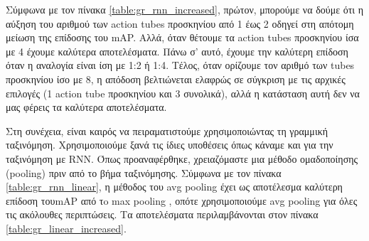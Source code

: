 Σύμφωνα με τον πίνακα  \ref{table:gr_rnn_increased}, πρώτον, μπορούμε να δούμε ότι η αύξηση του αριθμού των
\en action tubes \gr προσκηνίου από 1 έως 2 οδηγεί στη απότομη μείωση της  επίδοσης του \en mAP\gr.
Αλλά, όταν θέτουμε τα \en action tubes \gr προσκηνίου ίσα με 4 έχουμε καλύτερα αποτελέσματα. Πάνω σ' αυτό,
έχουμε την καλύτερη επίδοση όταν η αναλογία είναι ίση με 1:2 ή 1:4. Τέλος, όταν
 ορίζουμε τον αριθμό των \en tubes \gr προσκηνίου ίσο με 8, η απόδοση βελτιώνεται ελαφρώς
σε σύγκριση με τις αρχικές επιλογές (1 \en action tube \gr προσκηνίου και 3 συνολικά), αλλά η κατάσταση αυτή δεν
να μας φέρεις τα καλύτερα αποτελέσματα. \par
Στη συνέχεια, είναι καιρός να πειραματιστούμε χρησιμοποιώντας τη γραμμική ταξινόμηση. Χρησιμοποιούμε ξανά τις
ίδιες υποθέσεις όπως κάναμε και για την ταξινόμηση με \en RNN\gr. Όπως προαναφέρθηκε, χρειαζόμαστε μια
μέθοδο ομαδοποίησης (\en pooling\gr) πριν από το βήμα ταξινόμησης. Σύμφωνα με τον πίνακα \ref{table:gr_rnn_linear}, η μέθοδος
του \en avg pooling \gr έχει ως αποτέλεσμα καλύτερη επίδοση του\en mAP \gr από τo \en max pooling \gr, οπότε χρησιμοποιούμε \en avg pooling \gr
 για όλες τις ακόλουθες περιπτώσεις. Τα αποτελέσματα περιλαμβάνονται στον πίνακα \ref{table:gr_linear_increased}.
